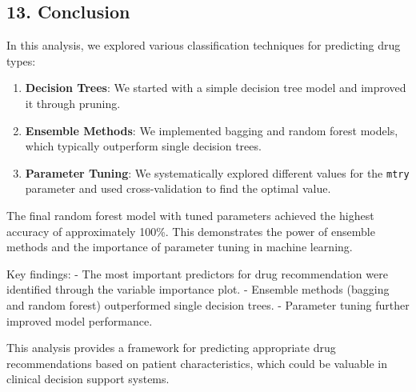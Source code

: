 \documentclass[
]{article}
\begin{document}
\subsection{13. Conclusion}\label{conclusion}

In this analysis, we explored various classification techniques for
predicting drug types:

\begin{enumerate}
\def\labelenumi{\arabic{enumi}.}
\item
  \textbf{Decision Trees}: We started with a simple decision tree model
  and improved it through pruning.
\item
  \textbf{Ensemble Methods}: We implemented bagging and random forest
  models, which typically outperform single decision trees.
\item
  \textbf{Parameter Tuning}: We systematically explored different values
  for the \texttt{mtry} parameter and used cross-validation to find the
  optimal value.
\end{enumerate}

The final random forest model with tuned parameters achieved the highest
accuracy of approximately 100\%. This demonstrates the power of ensemble
methods and the importance of parameter tuning in machine learning.

Key findings: - The most important predictors for drug recommendation
were identified through the variable importance plot. - Ensemble methods
(bagging and random forest) outperformed single decision trees. -
Parameter tuning further improved model performance.

This analysis provides a framework for predicting appropriate drug
recommendations based on patient characteristics, which could be
valuable in clinical decision support systems.
\end{document}
